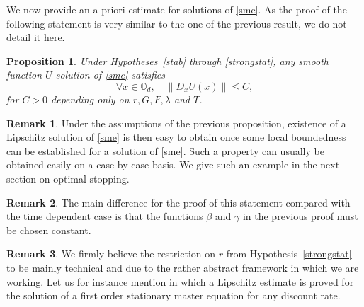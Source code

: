 \documentclass[JEP,XML,SOM,Unicode,NoEqCountersInSection,published]{cedram}
\newtheorem{Prop}{Proposition}[section]
\theoremstyle{definition}
\newtheorem{Rem}{Remark}[section]
\begin{document}
We now provide an a priori estimate for solutions of \eqref{sme}. As the proof of the following statement is very similar to the one of the previous result, we do not detail it here.
\begin{Prop}\label{existstat}
Under Hypotheses~\ref{stab} through \ref{strongstat}, any smooth function $U$ solution of \eqref{sme} satisfies
\begin{equation*}
\forall x \in \mathbb{O}_d,\quad \|D_xU(x)\| \leq C,
\end{equation*}
for $C > 0$ depending only on $r,G,F,\lambda$ and $T$.
\end{Prop}
\begin{Rem}\label{rembound}
Under the assumptions of the previous proposition, existence of a Lipschitz solution of \eqref{sme} is then easy to obtain once some local boundedness can be established for a solution of \eqref{sme}. Such a property can usually be obtained easily on a case by case basis. We give such an example in the next section on optimal stopping.
\end{Rem}
\begin{Rem}
The main difference for the proof of this statement compared with the time dependent case is that the functions $\beta$ and $\gamma$ in the previous proof must be chosen constant.
\end{Rem}
\begin{Rem}
We firmly believe the restriction on $r$ from Hypothesis~\ref{strongstat} to be mainly technical and due to the rather abstract framework in which we are working. Let us for instance mention \cite{cardaliaguet2019long} in which a Lipschitz estimate is proved for the solution of a first order stationary master equation for any discount rate.
\end{Rem}
\end{document}
